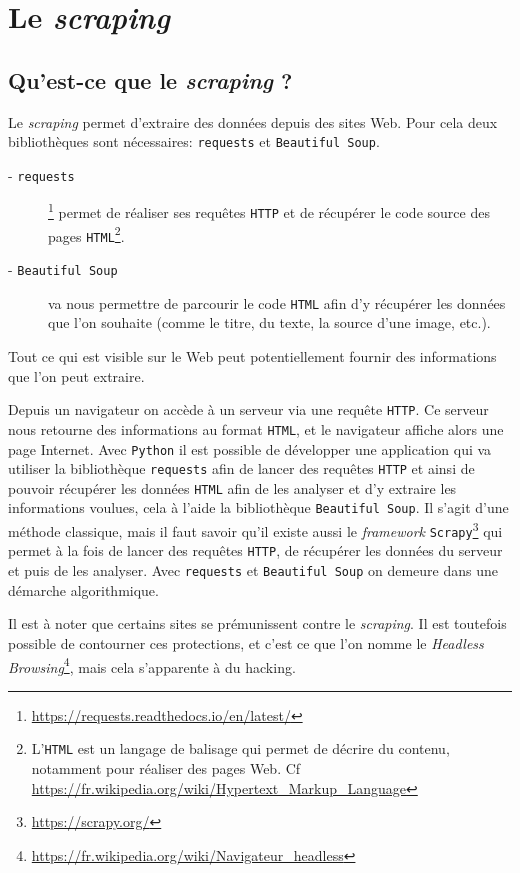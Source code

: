 \documentclass[a4paper,11pt]{book}
\begin{document}
\chapter{Le \textit{scraping}}
\section{Qu'est-ce que le \textit{scraping} ?}
Le \textit{scraping} permet d'extraire des données depuis des sites Web. Pour cela deux bibliothèques sont nécessaires: \texttt{requests} et \texttt{Beautiful Soup}.
\begin{description}
	\item[- \texttt{requests}]\footnote{\url{https://requests.readthedocs.io/en/latest/}} permet de réaliser ses requêtes \texttt{HTTP} et de récupérer le code source des pages \texttt{HTML}\footnote{L'\texttt{HTML} est un langage de balisage qui permet de décrire du contenu, notamment pour réaliser des pages Web. Cf \url{https://fr.wikipedia.org/wiki/Hypertext_Markup_Language}}.
	\item[- \texttt{Beautiful Soup}] va nous permettre de parcourir le code \texttt{HTML} afin d'y récupérer les données que l'on souhaite (comme le titre, du texte, la source d'une image, etc.).
\end{description}
\medskip

Tout ce qui est visible sur le Web peut potentiellement fournir des informations que l'on peut extraire.
\medskip

Depuis un navigateur on accède à un serveur via une requête \texttt{HTTP}. Ce serveur nous retourne des informations au format \texttt{HTML}, et le navigateur affiche alors une page Internet. Avec \texttt{Python} il est possible de développer une application qui va utiliser la bibliothèque \texttt{requests} afin de lancer des requêtes \texttt{HTTP} et ainsi de pouvoir récupérer les données \texttt{HTML} afin de les analyser et d'y extraire les informations voulues, cela à l'aide la bibliothèque \texttt{Beautiful Soup}. Il s'agit d'une méthode classique, mais il faut savoir qu'il existe aussi le \textit{framework} \texttt{Scrapy}\footnote{\url{https://scrapy.org/}} qui permet à la fois de lancer des requêtes \texttt{HTTP}, de récupérer les données du serveur et puis de les analyser. Avec \texttt{requests} et \texttt{Beautiful Soup} on demeure dans une démarche algorithmique.
\medskip

Il est à noter que certains sites se prémunissent contre le \textit{scraping}. Il est toutefois possible de contourner ces protections, et c'est ce que l'on nomme le \textit{Headless Browsing}\footnote{\url{https://fr.wikipedia.org/wiki/Navigateur_headless}}, mais cela s'apparente à du hacking.
\end{document}
